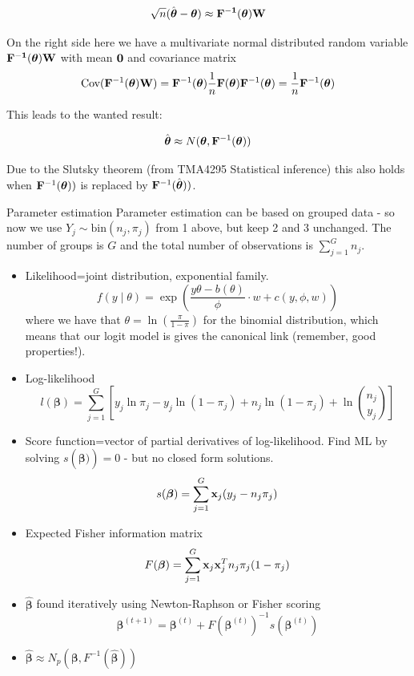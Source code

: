 \documentclass[
  ignorenonframetext,
]{beamer}
\begin{document}
\begin{frame}
\[
\sqrt{n}(\hat{\boldsymbol{\theta}}-{\boldsymbol{\theta}}) \approx \bf{F}^{-1}(\boldsymbol{\theta}){\bf W}
\]

On the right side here we have a multivariate normal distributed random
variable \(\bf{F}^{-1}(\boldsymbol{\theta}){\bf W}\) with mean
\({\bf 0}\) and covariance matrix
\[\text{Cov}({\bf F}^{-1}(\boldsymbol{\theta}){\bf W})={\bf F}^{-1}(\boldsymbol{\theta})\frac{1}{n}{\bf F}(\boldsymbol{\theta}){\bf F}^{-1}(\boldsymbol{\theta})=\frac{1}{n}{\bf F}^{-1}(\boldsymbol{\theta})\]

This leads to the wanted result:

\[ \hat{\boldsymbol{\theta}}\approx N(\boldsymbol{\theta},{\bf F}^{-1}(\boldsymbol{\theta}))\]

Due to the Slutsky theorem (from TMA4295 Statistical inference) this
also holds when \({\bf F}^{-1}(\boldsymbol{\theta}))\) is replaced by
\({\bf F}^{-1}(\hat{\boldsymbol{\theta}}))\).
\end{frame}

\begin{frame}{Parameter estimation}
\protect\hypertarget{parameter-estimation}{}
Parameter estimation can be based on grouped data - so now we use
\(Y_j \sim \text{bin}(n_j,\pi_j)\) from 1 above, but keep 2 and 3
unchanged. The number of groups is \(G\) and the total number of
observations is \(\sum_{j=1}^G n_j\).

\begin{itemize}
\item
  Likelihood=joint distribution, exponential family.
  \[ f(y\mid \theta)=\exp \left( \frac{y \theta-b(\theta)}{\phi}\cdot w + c(y, \phi, w) \right) \]
  where we have that \(\theta=\ln(\frac{\pi}{1-\pi})\) for the binomial
  distribution, which means that our logit model is gives the canonical
  link (remember, good properties!).
\item
  Log-likelihood
  \[l(\boldsymbol{\beta})=\sum_{j=1}^G[y_j \ln \pi_j-y_j\ln(1-\pi_j)+n_j\ln(1-\pi_j)+ \ln {n_j \choose y_j}]\]
\end{itemize}
\end{frame}

\begin{frame}
\begin{itemize}
\item
  Score function=vector of partial derivatives of log-likelihood. Find
  ML by solving \(s(\hat{\boldsymbol{\beta})})=0\) - but no closed form
  solutions.
  \[s(\boldsymbol{\beta})=\sum_{j=1}^G {\bf x}_j (y_j-n_j\pi_j)\]
\item
  Expected Fisher information matrix
  \[F(\boldsymbol{\beta})=\sum_{j=1}^G {\bf x}_j {\bf x}_j^T n_j \pi_j (1-\pi_j)\]
\item
  \(\hat{\boldsymbol{\beta}}\) found iteratively using Newton-Raphson or
  Fisher scoring
  \[\boldsymbol{\beta}^{(t+1)}=\boldsymbol{\beta}^{(t)} + F(\boldsymbol{\beta}^{(t)})^{-1} s(\boldsymbol{\beta}^{(t)})\]
\item
  \(\hat{\boldsymbol{\beta}} \approx N_p(\boldsymbol{\beta},F^{-1}(\hat{\boldsymbol{\beta}}))\)
\end{itemize}
\end{frame}
\end{document}
